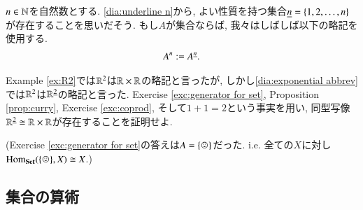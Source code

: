 $n\in{\mathbb N}$を自然数とする. \eqref{dia:underline n}から, よい性質を持つ集合$\underline{n}=\{1,2,\ldots,n\}$が存在することを思いだそう. もし$A$が集合ならば, 我々はしばしば以下の略記を使用する.
\begin{align}\label{dia:exponential abbrev}
A^n:=A^{\underline{n}}.
\end{align}

\begin{exercise}\label{exc:two R2s}
%
%
Example \ref{ex:R2}では${\mathbb R}^2$は${\mathbb R}\times{\mathbb R}$の略記と言ったが, しかし\eqref{dia:exponential abbrev}では${\mathbb R}^2$は${\mathbb R}^{\underline{2}}$の略記と言った. Exercise \ref{exc:generator for set}, Proposition \ref{prop:curry}, Exercise \ref{exc:coprod}, そして$1+1=2$という事実を用い, 同型写像${\mathbb R}^{\underline{2}}\cong{\mathbb R}\times{\mathbb R}$が存在することを証明せよ.

%
(Exercise \ref{exc:generator for set}の答えは$A=\singleton$だった. i.e. 全ての$X$に対し$\Hom_\Set(\singleton,X)\iso X$.)
%
\end{exercise}


\subsection{集合の算術}\label{sec:arithmetic of sets}


